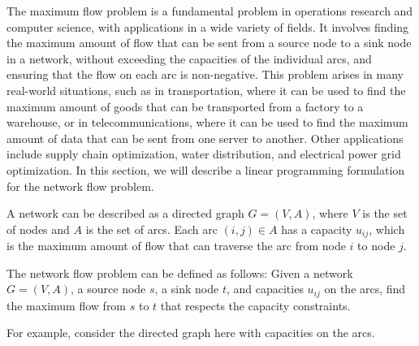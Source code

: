 The maximum flow problem is a fundamental problem in operations research and computer science, with applications in a wide variety of fields. It involves finding the maximum amount of flow that can be sent from a source node to a sink node in a network, without exceeding the capacities of the individual arcs, and ensuring that the flow on each arc is non-negative. This problem arises in many real-world situations, such as in transportation, where it can be used to find the maximum amount of goods that can be transported from a factory to a warehouse, or in telecommunications, where it can be used to find the maximum amount of data that can be sent from one server to another. Other applications include supply chain optimization, water distribution, and electrical power grid optimization. In this section, we will describe a linear programming formulation for the network flow problem.

A network can be described as a directed graph \( G = (V, A) \), where \( V \) is the set of nodes and \( A \) is the set of arcs. Each arc \( (i, j) \in A \) has a capacity \( u_{ij} \), which is the maximum amount of flow that can traverse the arc from node \( i \) to node \( j \).

The network flow problem can be defined as follows: Given a network \( G = (V, A) \), a source node \( s \), a sink node \( t \), and capacities \( u_{ij} \) on the arcs, find the maximum flow from \( s \) to \( t \) that respects the capacity constraints.

For example, consider the directed graph here with capacities on the arcs.
\begin{center}
\end{center}

